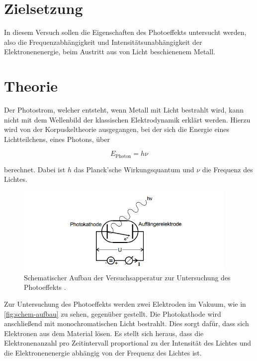 \section{Zielsetzung}

In diesem Versuch sollen die Eigenschaften des Photoeffekts untersucht werden,
also die Frequenzabhängigkeit und Intensitätsunabhängigkeit der Elektronenenergie,
beim Austritt aus von Licht beschienenem Metall.

\section{Theorie}
\label{sec:Theorie}

Der Photostrom, welcher entsteht, wenn Metall mit Licht bestrahlt wird, kann nicht mit dem Wellenbild der klassischen Elektrodynamik erklärt werden.
Hierzu wird von der Korpuskeltheorie ausgegangen, bei der sich die Energie eines Lichtteilchens, eines Photons, über

\begin{equation}
    \label{eqn:photon-energie}
    E_\text{Photon} = h \nu
\end{equation}

berechnet. Dabei ist $h$ das Planck'sche Wirkungsquantum und $\nu$ die Frequenz des Lichtes.


\begin{figure}
  \centering
  \includegraphics[width=0.95\textwidth]{content/schem-aufbau.png}
  \caption{Schematischer Aufbau der Versuchsapperatur zur Untersuchung des Photoeffekts \cite{V500}.}
  \label{fig:schem-aufbau}
\end{figure}


Zur Untersuchung des Photoeffekts werden zwei Elektroden im Vakuum, wie in \autoref{fig:schem-aufbau} zu sehen, gegenüber gestellt.
Die Photokathode wird anschließend mit monochromatischen Licht bestrahlt.
Dies sorgt dafür, dass sich Elektronen aus dem Material lösen.
Es stellt sich heraus, dass die Elektronenanzahl pro Zeitintervall proportional zu der Intensität des Lichtes und die Elektronenenergie abhängig von der Frequenz des Lichtes ist.

